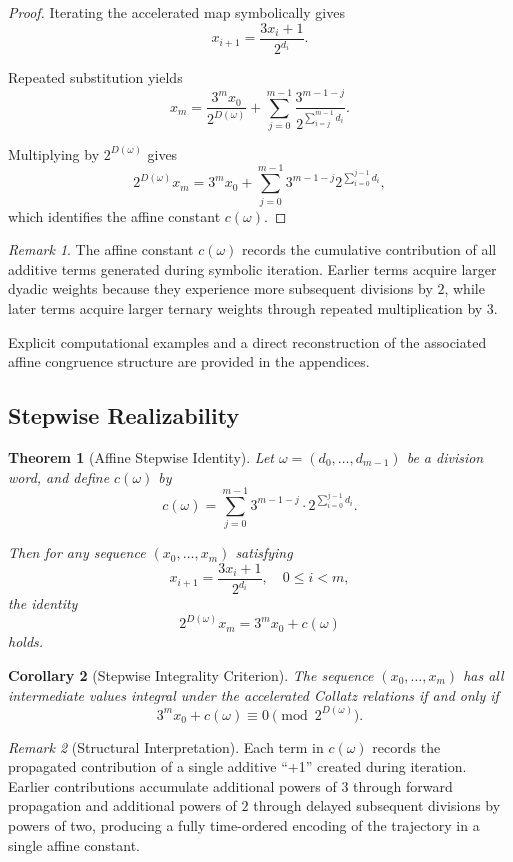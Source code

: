 \documentclass[12pt, oneside]{article}
\numberwithin{equation}{section}
\theoremstyle{definition}
\theoremstyle{plain}
\newtheorem{theorem}{Theorem}[section]
\newtheorem{corollary}[theorem]{Corollary}
\theoremstyle{remark}
\newtheorem*{remark}{Remark}
\begin{document}
\begin{proof}
Iterating the accelerated map symbolically gives
\[
x_{i+1}=\frac{3x_i+1}{2^{d_i}}.
\]

Repeated substitution yields
\[
x_m
=
\frac{3^m x_0}{2^{D(\omega)}}
+
\sum_{j=0}^{m-1}
\frac{
3^{m-1-j}
}{
2^{\sum_{i=j}^{m-1} d_i}
}.
\]

Multiplying by \(2^{D(\omega)}\) gives
\[
2^{D(\omega)}x_m
=
3^m x_0
+
\sum_{j=0}^{m-1}
3^{m-1-j}
2^{\sum_{i=0}^{j-1} d_i},
\]
which identifies the affine constant \(c(\omega)\).
\end{proof}

\begin{remark}
The affine constant \(c(\omega)\) records the cumulative contribution
of all additive terms generated during symbolic iteration. Earlier
terms acquire larger dyadic weights because they experience more
subsequent divisions by \(2\), while later terms acquire larger
ternary weights through repeated multiplication by \(3\).

Explicit computational examples and a direct reconstruction of the
associated affine congruence structure are provided in the appendices.
\end{remark}

\subsection{Stepwise Realizability}

\begin{theorem}[Affine Stepwise Identity]
\label{thm:affine-stepwise-identity}
Let $\omega = (d_0,\dots,d_{m-1})$ be a division word, and define $c(\omega)$ by
\[
c(\omega)
=
\sum_{j=0}^{m-1}
3^{m-1-j}\cdot 2^{\sum_{i=0}^{j-1} d_i}.
\]

Then for any sequence $(x_0,\dots,x_m)$ satisfying
\[
x_{i+1} = \frac{3x_i+1}{2^{d_i}}, \quad 0 \le i < m,
\]
the identity
\[
2^{D(\omega)} x_m = 3^m x_0 + c(\omega)
\]
holds.
\end{theorem}

\begin{corollary}[Stepwise Integrality Criterion]
The sequence $(x_0,\dots,x_m)$ has all intermediate values integral
under the accelerated Collatz relations if and only if
\[
3^m x_0 + c(\omega) \equiv 0 \pmod{2^{D(\omega)}}.
\]
\end{corollary}

\begin{remark}[Structural Interpretation]
Each term in $c(\omega)$ records the propagated contribution of a
single additive ``+1'' created during iteration. Earlier contributions
accumulate additional powers of $3$ through forward propagation and
additional powers of $2$ through delayed subsequent divisions by powers
of two, producing a fully time-ordered encoding of the trajectory in a
single affine constant.
\end{remark}
\end{document}
